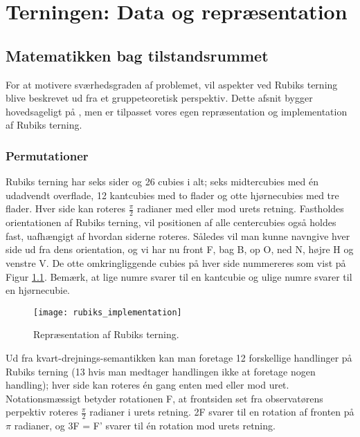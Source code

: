 \documentclass[../main.tex]{subfiles}
\begin{document}
\chapter{Terningen: Data og repræsentation}\label{chp:data}
\section{Matematikken bag tilstandsrummet}\label{sec:grouptheory}
For at motivere sværhedsgraden af problemet, vil aspekter ved Rubiks terning blive beskrevet ud fra et gruppeteoretisk perspektiv. Dette afsnit bygger hovedsageligt på \cite{GroupTheory}, men er tilpasset vores egen repræsentation og implementation af Rubiks terning. 
\subsection*{Permutationer}

Rubiks terning har seks sider og 26 cubies i alt; seks midtercubies med én udadvendt overflade, 12 kantcubies med to flader og otte hjørnecubies med tre flader. Hver side kan roteres $\frac{\pi}{2}$ radianer med eller mod urets retning. Fastholdes orientationen af Rubiks terning, vil positionen af alle centercubies også holdes fast, uafhængigt af hvordan siderne roteres. Således vil man kunne navngive hver side ud fra dens orientation, og vi har nu front F, bag B, op O, ned N, højre H og venstre V. De otte omkringliggende cubies på hver side nummereres som vist på Figur \ref{RubiksImplementation}. Bemærk, at lige numre svarer til en kantcubie og ulige numre svarer til en hjørnecubie.

\begin{figure}[H]
	\centering 
	\texttt{[image: rubiks\_implementation]}
	\caption{Repræsentation af Rubiks terning.}
	\label{RubiksImplementation}
\end{figure}
Ud fra kvart-drejnings-semantikken kan man foretage 12 forskellige handlinger på Rubiks terning (13 hvis man medtager handlingen ikke at foretage nogen handling);
hver side kan roteres én gang enten med eller mod uret. Notationsmæssigt betyder rotationen F, at frontsiden set fra observatørens perpektiv roteres $\frac{\pi}{2}$ radianer i urets retning. 2F svarer til en rotation af fronten på $\pi$ radianer, og 3F = F' svarer til én rotation mod urets retning. 
\end{document}

